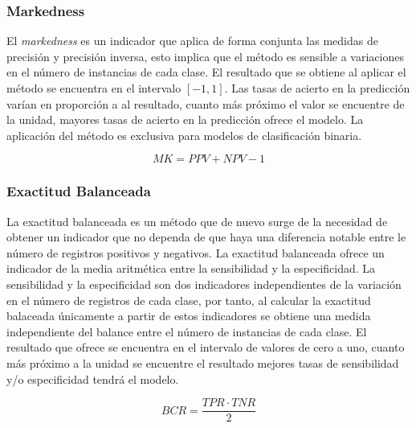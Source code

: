 \subsubsection{Markedness}

El \textit{markedness} \cite{MK2011} es un indicador que aplica de forma conjunta las medidas de precisión y precisión inversa, esto implica que el método es sensible a variaciones en el número de instancias de cada clase. El resultado que se obtiene al aplicar el método se encuentra en el intervalo $[-1, 1]$. Las tasas de acierto en la predicción varían en proporción a al resultado, cuanto más próximo el valor se encuentre de la unidad, mayores tasas de acierto en la predicción ofrece el modelo. La aplicación del método es exclusiva para modelos de clasificación binaria.  


\bigbreak

\begin{equation}
    MK = PPV + NPV - 1
    \label{eq:MK}
\end{equation}


\subsubsection{Exactitud Balanceada}

La exactitud balanceada \cite{bcr2010} es un método que de nuevo surge de la necesidad de obtener un indicador que no dependa de que haya una diferencia notable entre le número de registros positivos y negativos. La exactitud balanceada ofrece un indicador de la media aritmética entre la sensibilidad y la especificidad. La sensibilidad y la especificidad son dos indicadores independientes de la variación en el número de registros de cada clase, por tanto, al calcular la exactitud balaceada únicamente a partir de estos indicadores se obtiene una medida independiente del balance entre el número de instancias de cada clase. El resultado que ofrece se encuentra en el intervalo de valores de cero a uno, cuanto más próximo a la unidad se encuentre el resultado mejores tasas de sensibilidad y/o especificidad tendrá el modelo.

\bigbreak

\begin{equation}
    BCR = \frac{TPR \cdot TNR}{2}
    \label{eq:BCR}
\end{equation}


